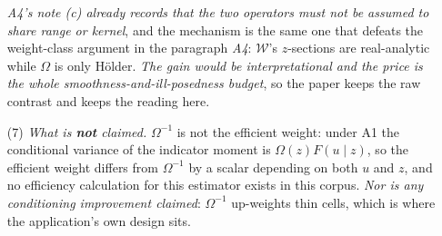 \begin{remark}
\begin{enumerate}
\emph{A4's note (c) already records
that the two operators must not be assumed to share range or kernel}, and the mechanism is the same one
that defeats the weight-class argument in the paragraph \emph{A4}: $\mathcal W$'s $z$-sections are
real-analytic while $\Omega$ is only H\"older. \emph{The gain would be interpretational and the price is
the whole smoothness-and-ill-posedness budget}, so the paper keeps the raw contrast and keeps the reading
here.
\item[(7)] \emph{What is \textbf{not} claimed.} $\Omega^{-1}$ is not the efficient weight: under A1 the
conditional variance of the indicator moment is $\Omega(z)F(u\mid z)$, so the efficient weight differs
from $\Omega^{-1}$ by a scalar depending on both $u$ and $z$, and no efficiency calculation for this
estimator exists in this corpus. \emph{Nor is any conditioning improvement claimed}: $\Omega^{-1}$
up-weights thin cells, which is where the application's own design sits.
\end{enumerate}
\end{remark}
